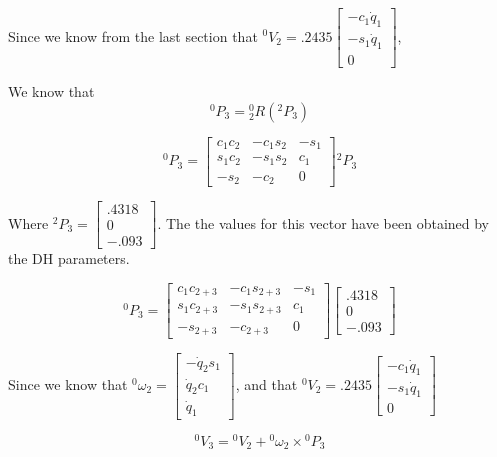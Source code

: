 \noindent Since we know from the last section that ${}^{0}V_{2} = .2435 \begin{bmatrix} -c_1\dot{q}_1 \\ -s_1\dot{q}_1 \\ 0\end{bmatrix}$,


\noindent We know that
$$
{}^{0}P_3 = {}^{0}_{2}R \left( {}^{2}P_3\right)
$$


$$
{}^{0}P_3 = \left[\begin{array}{ccc}
c_{1} c_{2} & -c_{1} s_{2} & -s_{1} \\
s_{1} c_{2} & -s_{1} s_{2} & c_{1} \\
-s_{2} & -c_{2} & 0
\end{array}\right] {}^{2}P_3
$$



\noindent Where ${}^{2}P_3 = \begin{bmatrix} .4318 \\ 0 \\ -.093 \end{bmatrix}$. The the values for this vector have been obtained by the DH parameters.



$$
{}^{0}P_3 = \left[\begin{array}{ccc}
c_{1} c_{2+3} & -c_{1} s_{2+3} & -s_{1} \\
s_{1} c_{2+3} & -s_{1} s_{2+3} & c_{1} \\
-s_{2+3} & -c_{2+3} & 0
\end{array}\right] \begin{bmatrix} .4318 \\ 0 \\ -.093 \end{bmatrix}
$$



\noindent Since we know that ${}^{0}\omega_2 = \left[\begin{array}{c} -\dot{q}_{2}s_{1} \\ \dot{q}_{2}c_{1} \\ \dot{q}_{1}\end{array}\right]$, and that ${}^{0}V_{2} = .2435 \begin{bmatrix} -c_1\dot{q}_1 \\ -s_1\dot{q}_1 \\ 0 \end{bmatrix}$

$$
{}^{0}V_{3} = {}^{0}V_2 + {}^{0}\omega_2 \times {}^{0}P_{3}
$$



